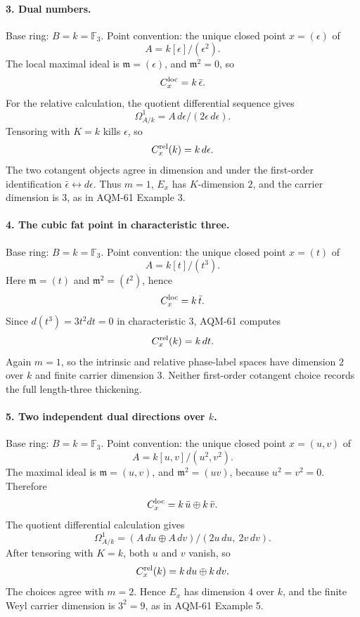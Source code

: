 \paragraph{3. Dual numbers.}
Base ring: \(B=k=\mathbb F_3\).  Point convention: the unique closed point
\(x=(\epsilon)\) of
\[
  A=k[\epsilon]/(\epsilon^2).
\]
The local maximal ideal is \(\mathfrak m=(\epsilon)\), and
\(\mathfrak m^2=0\), so
\[
  C_x^{\rm loc}=k\,\bar\epsilon .
\]
For the relative calculation, the quotient differential sequence gives
\[
  \Omega^1_{A/k}=A\,d\epsilon/(2\epsilon\,d\epsilon).
\]
Tensoring with \(K=k\) kills \(\epsilon\), so
\[
  C_x^{\rm rel}(k)=k\,d\epsilon .
\]
The two cotangent objects agree in dimension and under the first-order
identification \(\bar\epsilon\leftrightarrow d\epsilon\).  Thus \(m=1\),
\(E_x\) has \(K\)-dimension \(2\), and the carrier dimension is \(3\), as in
AQM-61 Example 3.

\paragraph{4. The cubic fat point in characteristic three.}
Base ring: \(B=k=\mathbb F_3\).  Point convention: the unique closed point
\(x=(t)\) of
\[
  A=k[t]/(t^3).
\]
Here \(\mathfrak m=(t)\) and \(\mathfrak m^2=(t^2)\), hence
\[
  C_x^{\rm loc}=k\,\bar t .
\]
Since \(d(t^3)=3t^2dt=0\) in characteristic \(3\), AQM-61 computes
\[
  C_x^{\rm rel}(k)=k\,dt .
\]
Again \(m=1\), so the intrinsic and relative phase-label spaces have
dimension \(2\) over \(k\) and finite carrier dimension \(3\).  Neither
first-order cotangent choice records the full length-three thickening.

\paragraph{5. Two independent dual directions over \(k\).}
Base ring: \(B=k=\mathbb F_3\).  Point convention: the unique closed point
\(x=(u,v)\) of
\[
  A=k[u,v]/(u^2,v^2).
\]
The maximal ideal is \(\mathfrak m=(u,v)\), and
\(\mathfrak m^2=(uv)\), because \(u^2=v^2=0\).  Therefore
\[
  C_x^{\rm loc}=k\,\bar u\oplus k\,\bar v .
\]
The quotient differential calculation gives
\[
  \Omega^1_{A/k}=
  (A\,du\oplus A\,dv)/(2u\,du,\ 2v\,dv).
\]
After tensoring with \(K=k\), both \(u\) and \(v\) vanish, so
\[
  C_x^{\rm rel}(k)=k\,du\oplus k\,dv .
\]
The choices agree with \(m=2\).  Hence \(E_x\) has dimension \(4\) over \(k\),
and the finite Weyl carrier dimension is \(3^2=9\), as in AQM-61 Example 5.

